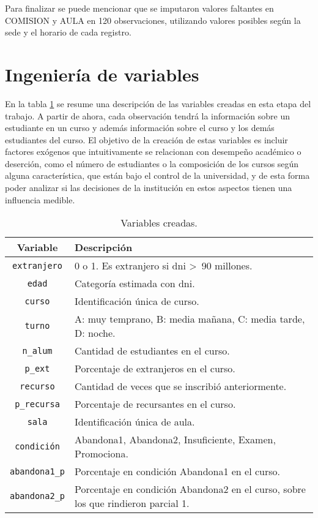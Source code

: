 \documentclass[a4paper,11pt,dvipsnames]{article}
\begin{document}
Para finalizar se puede mencionar que se imputaron valores faltantes en COMISION y AULA en 120 observaciones, utilizando valores posibles según la sede y el horario de cada registro.\par\medskip

\section{Ingeniería de variables}

En la tabla \ref{tab:nuevas} se resume una descripción de las variables creadas en esta etapa del trabajo. A partir de ahora, cada observación tendrá la información sobre un estudiante en un curso y además información sobre el curso y los demás estudiantes del curso. El objetivo de la creación de estas variables es incluir factores exógenos que intuitivamente se relacionan con desempeño académico o deserción, como el número de estudiantes o la composición de los cursos según alguna característica, que están bajo el control de la universidad, y de esta forma poder analizar si las decisiones de la institución en estos aspectos tienen una influencia medible.\cite{Tinto:firstyear}

\begin{table}[!hb]
    \caption{Variables creadas.}
    \begin{center}
    \begin{tabular}{cl}
    \hline
    \textbf{Variable} & \textbf{Descripción}\\
    \hline
    \texttt{extranjero}  & 0 o 1. Es extranjero si dni >\, 90 millones.\\
    \texttt{edad}        & Categoría estimada con dni.\\
    \texttt{curso} & Identificación única de curso.\\
    \texttt{turno} & A: muy temprano, B: media mañana, C: media tarde, D: noche.\\
    \texttt{n\_alum} & Cantidad de estudiantes en el curso.\\
    \texttt{p\_ext} & Porcentaje de extranjeros en el curso.\\
    \texttt{recurso} & Cantidad de veces que se inscribió anteriormente.\\
    \texttt{p\_recursa} & Porcentaje de recursantes en el curso.\\
    \texttt{sala} & Identificación única de aula.\\
    \texttt{condición} & Abandona1, Abandona2, Insuficiente, Examen, Promociona.\\
    \texttt{abandona1\_p} & Porcentaje en condición Abandona1 en el curso.\\
    \texttt{abandona2\_p} & Porcentaje en condición Abandona2 en el curso, sobre los que rindieron parcial 1.\\
    \hline
    \end{tabular}
    \label{tab:nuevas}
    \end{center}
\end{table}
\end{document}
